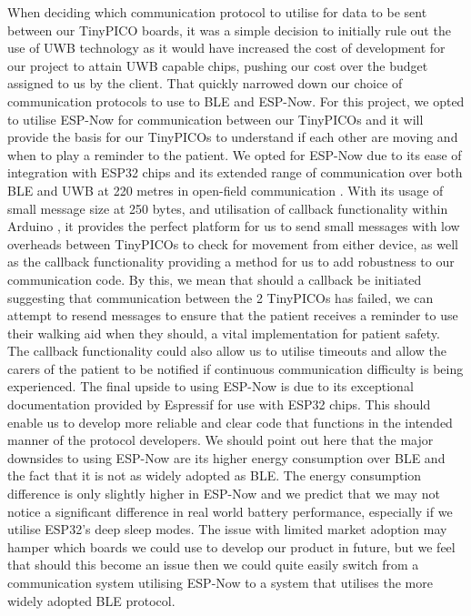 \documentclass[12pt, a4paper]{report}
\begin{document}
{When deciding which communication protocol to utilise for data to be sent between our TinyPICO boards, it was a simple decision to initially rule out the use of UWB technology as it would have increased the cost of development for our project to attain UWB capable chips, pushing our cost over the budget assigned to us by the client. That quickly narrowed down our choice of communication protocols to use to BLE and ESP-Now. For this project, we opted to utilise ESP-Now for communication between our TinyPICOs and it will provide the basis for our TinyPICOs to understand if each other are moving and when to play a reminder to the patient. We opted for ESP-Now due to its ease of integration with ESP32 chips and its extended range of communication over both BLE and UWB at 220 metres in open-field communication \cite{random_nerd_tutorials}. With its usage of small message size at 250 bytes, and utilisation of callback functionality within Arduino \cite{random_nerd_tutorials}, it provides the perfect platform for us to send small messages with low overheads between TinyPICOs to check for movement from either device, as well as the callback functionality providing a method for us to add robustness to our communication code. By this, we mean that should a callback be initiated suggesting that communication between the 2 TinyPICOs has failed, we can attempt to resend messages to ensure that the patient receives a reminder to use their walking aid when they should, a vital implementation for patient safety. The callback functionality could also allow us to utilise timeouts and allow the carers of the patient to be notified if continuous communication difficulty is being experienced. The final upside to using ESP-Now is due to its exceptional documentation provided by Espressif for use with ESP32 chips. This should enable us to develop more reliable and clear code that functions in the intended manner of the protocol developers. We should point out here that the major downsides to using ESP-Now are its higher energy consumption over BLE \cite{neupane_2019} and the fact that it is not as widely adopted as BLE. The energy consumption difference is only slightly higher in ESP-Now and we predict that we may not notice a significant difference in real world battery performance, especially if we utilise ESP32's deep sleep modes. The issue with limited market adoption may hamper which boards we could use to develop our product in future, but we feel that should this become an issue then we could quite easily switch from a communication system utilising ESP-Now to a system that utilises the more widely adopted BLE protocol.

}
\end{document}
